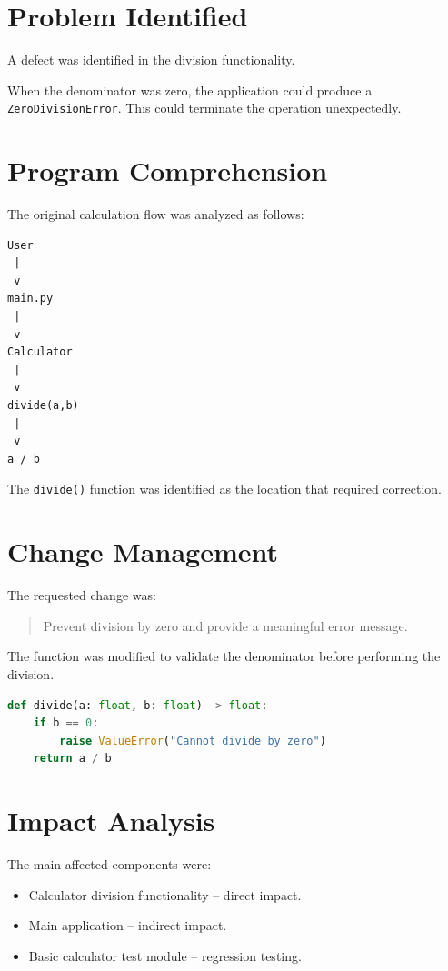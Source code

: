 \documentclass[12pt,a4paper]{report}
\begin{document}
\section{Problem Identified}

A defect was identified in the division functionality.

When the denominator was zero, the application could produce a
\texttt{ZeroDivisionError}. This could terminate the operation
unexpectedly.

\section{Program Comprehension}

The original calculation flow was analyzed as follows:

\begin{lstlisting}
User
 |
 v
main.py
 |
 v
Calculator
 |
 v
divide(a,b)
 |
 v
a / b
\end{lstlisting}

The \texttt{divide()} function was identified as the location that
required correction.

\section{Change Management}

The requested change was:

\begin{quote}
Prevent division by zero and provide a meaningful error message.
\end{quote}

The function was modified to validate the denominator before
performing the division.

\begin{lstlisting}[language=Python]
def divide(a: float, b: float) -> float:
    if b == 0:
        raise ValueError("Cannot divide by zero")
    return a / b
\end{lstlisting}

\section{Impact Analysis}

The main affected components were:

\begin{itemize}
    \item Calculator division functionality -- direct impact.
    \item Main application -- indirect impact.
    \item Basic calculator test module -- regression testing.
\end{itemize}
\end{document}
